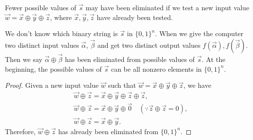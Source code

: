 \begin{remark}
Fewer possible values of $\vec{s}$ may have been eliminated if we test a new input value $\vec{w} = \vec{x} \oplus \vec{y} \oplus \vec{z}$, where $\vec{x}, \vec{y}, \vec{z}$ have already been tested.
\end{remark}

\begin{mdframed}
We don't know which binary string is $\vec{s}$ in $\{0,1\}^n$. When we give the computer two distinct input values $\vec{\alpha}$, $\vec{\beta}$ and get two distinct output values $f(\vec{\alpha}),f(\vec{\beta})$. Then we say $\vec{\alpha} \oplus \vec{\beta}$ has been eliminated from possible values of $\vec{s}$. At the beginning, the possible values of $\vec{s}$ can be all nonzero elements in $\{0,1\}^n$.
\end{mdframed}

\begin{proof}
Given a new input value $\vec{w}$ such that $\vec{w}=\vec{x} \oplus \vec{y} \oplus \vec{z}$, we have 
\begin{equation}
\begin{aligned}
	& \vec{w} \oplus \vec{z}=\vec{x} \oplus \vec{y} \oplus \vec{z} \oplus \vec{z}, \\
	& \vec{w} \oplus \vec{z}=\vec{x} \oplus \vec{y} \oplus \vec{0} \quad(\because \vec{z} \oplus \vec{z}=0), \\
	& \vec{w} \oplus \vec{z}=\vec{x} \oplus \vec{y}.
\end{aligned}
\end{equation}
Therefore, $\vec{w} \oplus \vec{z}$ has already been eliminated from $\{0,1\}^n$.
\end{proof}


